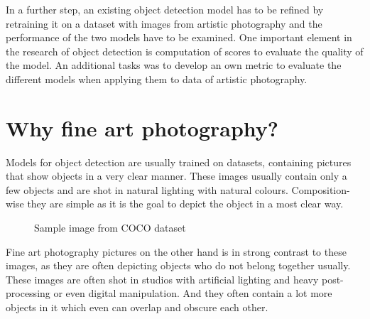 In a further step, an existing object detection model has to be refined by retraining it on a dataset with images from artistic photography and the performance of the two models have to be examined.
One important element in the research of object detection is computation of scores to evaluate the quality of the model. An additional tasks was to develop an own metric to evaluate the different models when applying them to data of artistic photography.

\section{Why fine art photography?}
\label{ch:why-fine-art}
Models for object detection are usually trained on datasets, containing pictures that show objects in a very clear manner. These images usually contain only a few objects and are shot in natural lighting with natural colours. Composition-wise they are simple as it is the goal to depict the object in a most clear way.

\begin{figure}[H]
	\caption{\label{fig:coco-sample} Sample image from COCO dataset}
\end{figure}

Fine art photography pictures on the other hand is in strong contrast to these images, as they are often depicting objects who do not belong together usually. These images are often shot in studios with artificial lighting and heavy post-processing or even digital manipulation. And they often contain a lot more objects in it which even can overlap and obscure each other.

